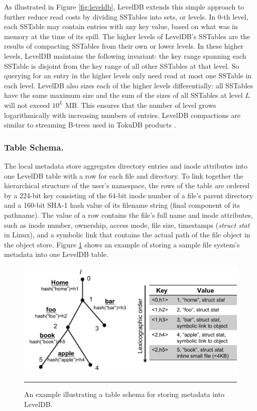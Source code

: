 As illustrated in Figure \ref{fig:leveldb}, LevelDB extends this simple approach to further reduce read costs by dividing SSTables into sets, or levels.
In 0-th level, each SSTable may contain entries with any key value, based on what was in memory at the time of its spill.
The higher levels of LevelDB's SSTables are the results of compacting SSTables from their own or lower levels.
In these higher levels, LevelDB maintains the following invariant: the key range spanning each SSTable is disjoint from the key range of all other SSTables at that level.
So querying for an entry in the higher levels only need read at most one SSTable in each level.
LevelDB also sizes each of the higher levels differentially:  all SSTables have the same maximum size and the sum of the sizes of all SSTables at level $L$ will not exceed $10^L$ MB.
This ensures that the number of level grows logarithmically with increasing numbers of entries.
LevelDB compactions are similar to streaming B-trees used in TokuDB products
\citep{Bender2007, tokufs}.

\subsubsection*{Table Schema. } 

The local metadata store aggregates directory entries and  
inode attributes into one LevelDB table with a row for each file and directory.
To link together the hierarchical structure of the user's namespace,
the rows of the table are ordered by a 224-bit key consisting of 
the 64-bit inode number of a file's parent directory 
and a 160-bit SHA-1 hash value of its filename string (final component of its pathname).
The value of a row contains the file's full name and inode attributes,
such as inode number, ownership, access mode, file size, timestamps (\textit{struct stat} in Linux),
and a symbolic link that contains the actual path of the file object in the object store.
Figure \ref{fig:schema} shows an example of storing a sample file system's metadata into one LevelDB table.

\begin{figure}[t]
\centering
\includegraphics[scale=0.35]{figs/schema}
\caption{An example illustrating a table schema for storing metadata into LevelDB.}
\vspace{10pt}
\hrule 
\label{fig:schema}
\end{figure}

